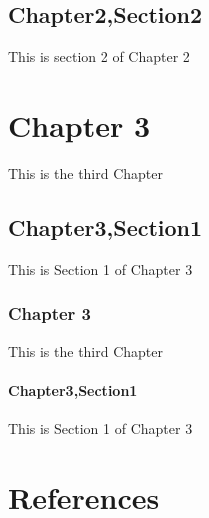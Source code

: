 \documentclass[letterpaper,10pt,english]{sphinxmanual}
\begin{document}
\section{Chapter2,Section2}
\label{\detokenize{chapter2:chapter2-section2}}
This is section 2 of Chapter 2


\chapter{Chapter 3}
\label{\detokenize{chapter3:chapter-3}}\label{\detokenize{chapter3::doc}}
This is the third Chapter


\section{Chapter3,Section1}
\label{\detokenize{chapter3:chapter3-section1}}
This is Section 1 of Chapter 3


\subsection{Chapter 3}
\label{\detokenize{chapter3section2:chapter-3}}\label{\detokenize{chapter3section2::doc}}
This is the third Chapter


\subsubsection{Chapter3,Section1}
\label{\detokenize{chapter3section2:chapter3-section1}}
This is Section 1 of Chapter 3


\chapter{References}
\label{\detokenize{references:references}}\label{\detokenize{references::doc}}








\renewcommand{\indexname}{Index}
\printindex
\end{document}
